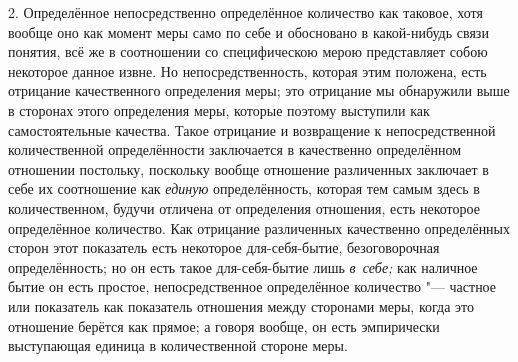2. Определённое непосредственно определённое количество как таковое, хотя
вообще оно как момент меры само по себе и обосновано в какой-нибудь связи
понятия, всё же в соотношении со специфическою мерою представляет собою
некоторое данное извне. Но непосредственность, которая этим положена, есть
отрицание качественного определения меры; это отрицание мы обнаружили выше в
сторонах этого определения меры, которые поэтому выступили как самостоятельные
качества. Такое отрицание и возвращение к непосредственной количественной
определённости заключается в качественно определённом отношении постольку,
поскольку вообще отношение различенных заключает в себе их соотношение как
{\em единую} определённость, которая тем самым здесь в количественном, будучи
отличена от определения отношения, есть некоторое определённое количество. Как
отрицание различенных качественно определённых сторон этот показатель есть
некоторое для-себя-бытие, безоговорочная определённость; но он есть такое
для-себя-бытие лишь {\em в~себе;} как наличное бытие он есть простое,
непосредственное определённое количество "--- частное или показатель как
показатель отношения между сторонами меры, когда это отношение берётся как
прямое; а говоря вообще, он есть эмпирически выступающая единица в
количественной стороне меры.
